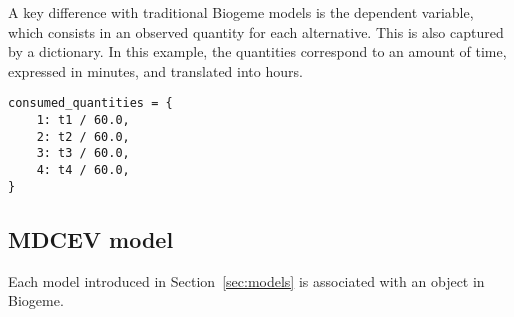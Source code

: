\documentclass[12pt,a4paper]{article}
\begin{document}
A key difference with traditional Biogeme models is the dependent variable, which consists in an observed quantity for
each alternative. This is also captured by a dictionary. In this example, the quantities correspond to an amount of time,
expressed in minutes, and translated into hours.
\begin{lstlisting}
consumed_quantities = {
    1: t1 / 60.0,
    2: t2 / 60.0,
    3: t3 / 60.0,
    4: t4 / 60.0,
}
\end{lstlisting}

\subsection{MDCEV model}

Each model introduced in Section~\ref{sec:models} is associated with an object in Biogeme.
\end{document}
